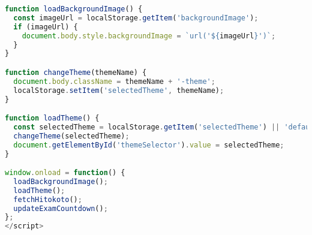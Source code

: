 \documentclass{hfutreport}
\begin{document}
\begin{appendices}
\begin{lstlisting}[language=javascript]
function loadBackgroundImage() {
  const imageUrl = localStorage.getItem('backgroundImage');
  if (imageUrl) {
    document.body.style.backgroundImage = `url('${imageUrl}')`;
  }
}

function changeTheme(themeName) {
  document.body.className = themeName + '-theme';
  localStorage.setItem('selectedTheme', themeName);
}

function loadTheme() {
  const selectedTheme = localStorage.getItem('selectedTheme') || 'default';
  changeTheme(selectedTheme);
  document.getElementById('themeSelector').value = selectedTheme;
}

window.onload = function() {
  loadBackgroundImage();
  loadTheme();
  fetchHitokoto();
  updateExamCountdown();
};
</script>

\end{lstlisting}

\end{appendices}
\end{document}
